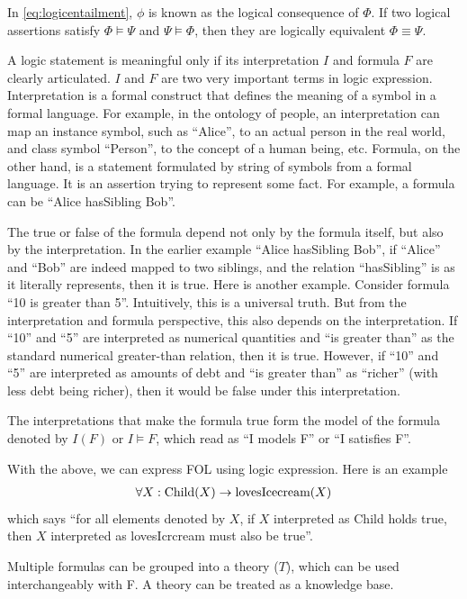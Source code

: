 In \eqref{eq:logicentailment}, $\phi$ is known as the logical consequence of $\Phi$. If two logical assertions satisfy $\Phi \models \Psi$ and $\Psi \models \Phi$, then they are logically equivalent $\Phi \equiv \Psi$.

A logic statement is meaningful only if its interpretation $I$ and formula $F$ are clearly articulated. $I$ and $F$ are two very important terms in logic expression. Interpretation is a formal construct that defines the meaning of a symbol in a formal language. For example, in the ontology of people, an interpretation can map an instance symbol, such as ``Alice'', to an actual person in the real world, and class symbol ``Person'', to the concept of a human being, etc. Formula, on the other hand, is a statement formulated by string of symbols from a formal language. It is an assertion trying to represent some fact. For example, a formula can be ``Alice hasSibling Bob''. 

The true or false of the formula depend not only by the formula itself, but also by the interpretation. In the earlier example ``Alice hasSibling Bob'', if ``Alice'' and ``Bob'' are indeed mapped to two siblings, and the relation ``hasSibling'' is as it literally represents, then it is true. Here is another example. Consider formula ``10 is greater than 5''. Intuitively, this is a universal truth. But from the interpretation and formula perspective, this also depends on the interpretation. If ``10'' and ``5'' are interpreted as numerical quantities and ``is greater than'' as the standard numerical greater-than relation, then it is true. However, if ``10'' and ``5'' are interpreted as amounts of debt and ``is greater than'' as ``richer'' (with less debt being richer), then it would be false under this interpretation.

The interpretations that make the formula true form the model of the formula denoted by $I(F)$ or $I \models F$, which read as ``I models F'' or ``I satisfies F''. 

With the above, we can express FOL using logic expression. Here is an example
\begin{eqnarray}
	\forall X: \textup{Child}(X) \rightarrow \textup{lovesIcecream}(X) \nonumber
\end{eqnarray}
which says ``for all elements denoted by $X$, if $X$ interpreted as Child holds true, then $X$ interpreted as lovesIcrcream must also be true''.

Multiple formulas can be grouped into a theory ($T$), which can be used interchangeably with F. A theory can be treated as a knowledge base.

